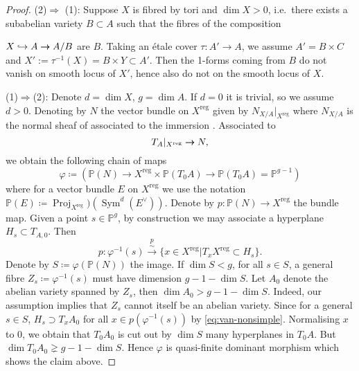 \documentclass[a4paper,12pt,reqno]{amsart}
\theoremstyle{plain}
\theoremstyle{definition}
\theoremstyle{remark}
\newcommand{\C}{\mathbb C}
\newcommand{\Sym}{\operatorname{Sym}}
\newcommand{\Proj}{\operatorname{Proj}}
\renewcommand{\cong}{\simeq}
\newcommand{\bbP}{\mathbb{P}}
\newcommand{\into}{\hookrightarrow}
\newcommand{\onto}{\rightarrow\hspace*{-.14in}\rightarrow}
\DeclareMathOperator{\reg}{reg}
\begin{document}
\begin{proof}\label{proof:van-nonsimple} (2)$\Rightarrow$ (1): Suppose $X$ is fibred by tori and $\dim X>0$, i.e.\ there exists a subabelian variety $B\subset A$ such that the fibres of the composition 

$X\into A \onto A/B$ are $B$. Taking an \'etale cover $\tau: A'\to A$, we assume $A'=B\times C$ and $X':=\tau^{-1}(X)=B\times Y\subset A'$. Then the 1-forms coming from $B$ do not vanish on smooth locus of $X'$, hence also do not on the smooth locus of $X$. 

(1)$\Rightarrow$(2): Denote $d=\dim X$, $g=\dim A$. If $d=0$ it is trivial, so we assume $d>0$. Denoting by $N$ the
vector bundle on $X^{\reg}$ given by $N_{X/A}|_{X^{\reg}}$ where $N_{X/A}$ is the normal sheaf of associated to the immersion
 \cite[\href{https://stacks.math.columbia.edu/tag/01R1}{Tag 01R1}]{stacks-project}. Associated to \[T_A|_{X^{\reg}}\onto N,\]
we obtain the following chain of maps
\[\varphi\coloneqq (\bbP(N) \to 	X^{\reg}\times \bbP(T_0{A}) \to \bbP(T_0A)=\bbP^{g-1})\]
where for a vector bundle $E$ on $X^{\reg}$ we use the notation $\bbP(E) \coloneqq \Proj_{X^{\reg}})(\Sym^d(E^{\vee}))$.
Denote by $p\colon \bbP(N)\to X^{\reg}$ the bundle map. Given
a point $s\in \bbP^g$, by construction we may associate a hyperplane $H_s\subset T_{A,0}$. Then
\begin{equation}
p\colon \varphi^{-1}(s) \overset{p}{\xrightarrow{\sim}}  \{x\in X^{\reg}| T_xX^{\reg} \subset H_s\}.
\label{eq:van-nonsimple}
\end{equation}
Denote by $S\coloneqq \varphi(\bbP(N))$ the image. If $\dim S<g$, for all $s\in S$, a general
 fibre $Z_s \coloneqq \varphi^{-1}(s)$
must have dimension $g - 1 - \dim S$. Let $A_0$ denote the abelian variety spanned by $Z_s$, then $\dim A_0 > g- 1 - \dim S$. Indeed,
our assumption implies that $Z_s$ cannot itself be an abelian variety. Since for a general $s\in S$, $H_s \supset T_xA_0$
for all $x\in p(\varphi^{-1}(s))$ by \eqref{eq:van-nonsimple}. Normalising $x$ to $0$, we obtain that $T_0A_0$
is cut out by $\dim S$ many hyperplanes in $T_0A$. But $\dim T_0A_0 \gneq g -1 - \dim S$. Hence $\varphi$ is quasi-finite
dominant morphism which shows the claim above.

\end{proof}
\end{document}

